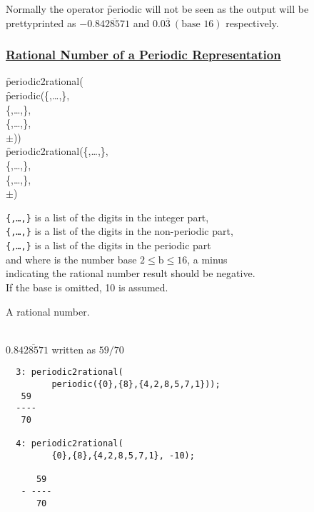 Normally the operator \f{periodic} will not be seen as the output
will be prettyprinted as $-0.8\overline{428571}$ and
$0.0\overline{3}\ (\mbox{base }16)$ respectively.

\subsubsection*{\textbf{\underline{Rational Number of a Periodic Representation}}}

\begin{description}[labelwidth=!,leftmargin=20mm]

\item[\textbf{SYNTAX:}]

  \begin{syntax}
    \f{periodic2rational(}\\
    \quad\f{periodic(}\{,\ldots,\},\\
    \quad{}\{,\ldots,\},\\
    \quad{}\{,\ldots,\},\\
    \quad{}$\pm$))\\[\baselineskip]
    \f{periodic2rational(}\{,\ldots,\},\\
    \{,\ldots,\},\\
    \{,\ldots,\},\\
    $\pm$)
  \end{syntax}
  
\item[\textbf{INPUT:}]
  \texttt{\{,\ldots,\}} is a list of the digits in the integer part,\\
  \texttt{\{,\ldots,\}} is a list of the digits in the non-periodic part,\\
  \texttt{\{,\ldots,\}} is a list of the digits in the periodic part\\
  and where  is the number base $2 \leq \mathrm{b} \leq 16$, a minus\\
  indicating the rational number result should be negative. \\
  If the base is omitted, 10 is assumed.

\item[\textbf{RESULT:}]
  A rational number.

\item[\textbf{EXAMPLES:}]\mbox{}\\
  $0.8\overline{428571}$ written as $59/70$
  \begin{verbatim}
  3: periodic2rational(
         periodic({0},{8},{4,2,8,5,7,1}));
   59
  ----
   70

  4: periodic2rational(
         {0},{8},{4,2,8,5,7,1}, -10);

      59
   - ----
      70
\end{verbatim}
\end{description}


